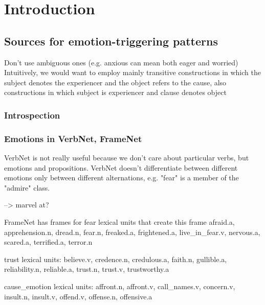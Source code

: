 
\chapter{Introduction} %

\label{ch:introduction} %


\section{Sources for emotion-triggering patterns}

Don't use ambiguous ones (e.g. anxious can mean both eager and worried)
Intuitively, we would want to employ mainly transitive constructions in which the subject denotes the experiencer and the object refers to the cause, also constructions in which subject is experiencer and clause denotes object



\subsection{Introspection}



\subsection{Emotions in VerbNet, FrameNet}
VerbNet is not really useful because we don't care about particular verbs, but emotions and propositions. VerbNet doesn't differentiate between different emotions only between different alternations, e.g. "fear" is a member of the "admire" class.

--> marvel at?

FrameNet has frames for
fear
lexical units that create this frame
afraid.a, apprehension.n, dread.n, fear.n, freaked.a, frightened.a, live_in_fear.v, nervous.a, scared.a, terrified.a, terror.n

trust
lexical units: believe.v, credence.n, credulous.a, faith.n, gullible.a, reliability.n, reliable.a, trust.n, trust.v, trustworthy.a

cause_emotion
lexical units: affront.n, affront.v, call_names.v, concern.v, insult.n, insult.v, offend.v, offense.n, offensive.a



